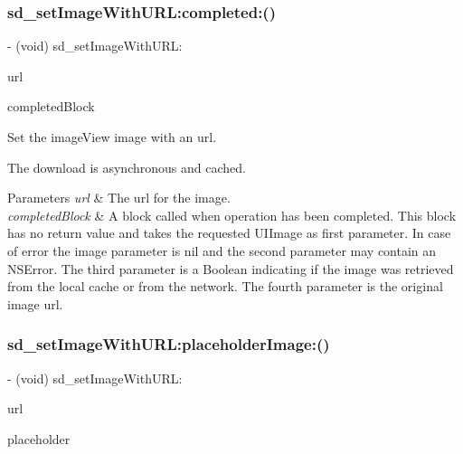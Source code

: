 \subsubsection{\texorpdfstring{sd\+\_\+set\+Image\+With\+U\+R\+L\+:completed\+:()}{sd\_setImageWithURL:completed:()}\hspace{0.1cm}{\footnotesize\ttfamily [3/3]}}
{\footnotesize\ttfamily -\/ (void) sd\+\_\+set\+Image\+With\+U\+R\+L\+: \begin{DoxyParamCaption}\item[{(N\+S\+U\+RL $\ast$)}]{url }\item[{completed:(S\+D\+Web\+Image\+Completion\+Block)}]{completed\+Block }\end{DoxyParamCaption}}

Set the image\+View {\ttfamily image} with an {\ttfamily url}.

The download is asynchronous and cached.


\begin{DoxyParams}{Parameters}
{\em url} & The url for the image. \\
\hline
{\em completed\+Block} & A block called when operation has been completed. This block has no return value and takes the requested U\+I\+Image as first parameter. In case of error the image parameter is nil and the second parameter may contain an N\+S\+Error. The third parameter is a Boolean indicating if the image was retrieved from the local cache or from the network. The fourth parameter is the original image url. \\
\hline
\end{DoxyParams}
\mbox{\label{category_u_i_image_view_07_web_cache_08_a82e4106ff7460eff97dae9b79a539c41}} 
\subsubsection{\texorpdfstring{sd\+\_\+set\+Image\+With\+U\+R\+L\+:placeholder\+Image\+:()}{sd\_setImageWithURL:placeholderImage:()}\hspace{0.1cm}{\footnotesize\ttfamily [1/3]}}
{\footnotesize\ttfamily -\/ (void) sd\+\_\+set\+Image\+With\+U\+R\+L\+: \begin{DoxyParamCaption}\item[{(N\+S\+U\+RL $\ast$)}]{url }\item[{placeholderImage:(U\+I\+Image $\ast$)}]{placeholder }\end{DoxyParamCaption}}

